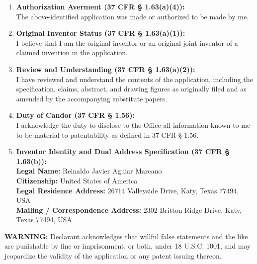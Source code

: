 \documentclass[11pt,letterpaper]{article}
\begin{document}
\begin{enumerate}[leftmargin=*]
    \item \textbf{Authorization Averment (37 CFR \S{} 1.63(a)(4)):} \\
    The above-identified application was made or authorized to be made by me.

    \item \textbf{Original Inventor Status (37 CFR \S{} 1.63(a)(1)):} \\
    I believe that I am the original inventor or an original joint inventor of a claimed invention in the application.

    \item \textbf{Review and Understanding (37 CFR \S{} 1.63(a)(2)):} \\
    I have reviewed and understand the contents of the application, including the specification, claims, abstract, and drawing figures as originally filed and as amended by the accompanying substitute papers.

    \item \textbf{Duty of Candor (37 CFR \S{} 1.56):} \\
    I acknowledge the duty to disclose to the Office all information known to me to be material to patentability as defined in 37 CFR \S{} 1.56.

    \item \textbf{Inventor Identity and Dual Address Specification (37 CFR \S{} 1.63(b)):} \\
    \textbf{Legal Name:} Reinaldo Javier Aguiar Marcano \\
    \textbf{Citizenship:} United States of America \\
    \textbf{Legal Residence Address:} 26714 Valleyside Drive, Katy, Texas 77494, USA \\
    \textbf{Mailing / Correspondence Address:} 2302 Britton Ridge Drive, Katy, Texas 77494, USA
\end{enumerate}

\vspace{0.4cm}
\textbf{WARNING:} Declarant acknowledges that willful false statements and the like are punishable by fine or imprisonment, or both, under 18 U.S.C. 1001, and may jeopardize the validity of the application or any patent issuing thereon.
\end{document}
